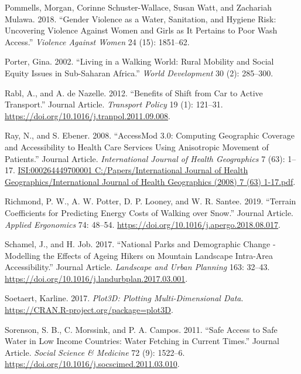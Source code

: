 \documentclass[]{elsarticle} %
\begin{document}
\leavevmode\hypertarget{ref-Pommells2018gender}{}%
Pommells, Morgan, Corinne Schuster-Wallace, Susan Watt, and Zachariah
Mulawa. 2018. ``Gender Violence as a Water, Sanitation, and Hygiene
Risk: Uncovering Violence Against Women and Girls as It Pertains to Poor
Wash Access.'' \emph{Violence Against Women} 24 (15): 1851--62.

\leavevmode\hypertarget{ref-Porter2002}{}%
Porter, Gina. 2002. ``Living in a Walking World: Rural Mobility and
Social Equity Issues in Sub-Saharan Africa.'' \emph{World Development}
30 (2): 285--300.

\leavevmode\hypertarget{ref-Rabl2012benefits}{}%
Rabl, A., and A. de Nazelle. 2012. ``Benefits of Shift from Car to
Active Transport.'' Journal Article. \emph{Transport Policy} 19 (1):
121--31. \url{https://doi.org/10.1016/j.tranpol.2011.09.008}.

\leavevmode\hypertarget{ref-Ray2008}{}%
Ray, N., and S. Ebener. 2008. ``AccessMod 3.0: Computing Geographic
Coverage and Accessibility to Health Care Services Using Anisotropic
Movement of Patients.'' Journal Article. \emph{International Journal of
Health Geographics} 7 (63): 1--17.
\href{ISI:000264449700001\%0AC:/Papers/International\%20Journal\%20of\%20Health\%20Geographics/International\%20Journal\%20of\%20Health\%20Geographics\%20(2008)\%207\%20(63)\%201-17.pdf}{ISI:000264449700001
C:/Papers/International Journal of Health Geographics/International Journal of Health Geographics (2008) 7 (63) 1-17.pdf}.

\leavevmode\hypertarget{ref-Richmond2019terrain}{}%
Richmond, P. W., A. W. Potter, D. P. Looney, and W. R. Santee. 2019.
``Terrain Coefficients for Predicting Energy Costs of Walking over
Snow.'' Journal Article. \emph{Applied Ergonomics} 74: 48--54.
\url{https://doi.org/10.1016/j.apergo.2018.08.017}.

\leavevmode\hypertarget{ref-Schamel2017}{}%
Schamel, J., and H. Job. 2017. ``National Parks and Demographic Change -
Modelling the Effects of Ageing Hikers on Mountain Landscape Intra-Area
Accessibility.'' Journal Article. \emph{Landscape and Urban Planning}
163: 32--43. \url{https://doi.org/10.1016/j.landurbplan.2017.03.001}.

\leavevmode\hypertarget{ref-Soetaert2017}{}%
Soetaert, Karline. 2017. \emph{Plot3D: Plotting Multi-Dimensional Data}.
\url{https://CRAN.R-project.org/package=plot3D}.

\leavevmode\hypertarget{ref-Sorenson2011safe}{}%
Sorenson, S. B., C. Morssink, and P. A. Campos. 2011. ``Safe Access to
Safe Water in Low Income Countries: Water Fetching in Current Times.''
Journal Article. \emph{Social Science \& Medicine} 72 (9): 1522--6.
\url{https://doi.org/10.1016/j.socscimed.2011.03.010}.
\end{document}
